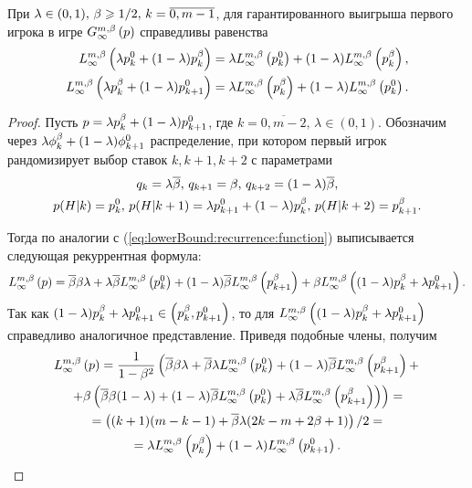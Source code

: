 \begin{proposition}
  \label{proposition:first:combination:game}
  При $\lambda \in (0, 1), \, \Co \geq 1/2, \, k = \overline{0, m-1}$,
  для гарантированного выигрыша первого игрока в игре $\infiniteGame{p}$
  справедливы равенства
  \begin{align*}
    \lowerBound{\lambda \pEven + (1-\lambda) \pOdd}      & = 
                                                           \lambda \lowerBound{\pEven} + (1-\lambda) \lowerBound{\pOdd}, \\
    \lowerBound{\lambda \pOdd + (1-\lambda) \pEven[k+1]} & =
                                                           \lambda \lowerBound{\pOdd} + (1-\lambda) \lowerBound{\pEven}.
  \end{align*}
\end{proposition}
\begin{proof}
  Пусть $p = \lambda \pOdd + (1-\lambda) \pEven[k+1]$, где $k =
  \overline{0, m - 2}, \, \lambda \in (0, 1)$. Обозначим через
  $\lambda\fOdd[k] + (1-\lambda)\fEven[k+1]$ распределение, при котором
  первый игрок рандомизирует выбор ставок $k, k+1, k+2$ с параметрами
  \begin{gather*}
    q_k = \lambda\DCo, \, q_{k+1} = \Co, \, q_{k+2} = (1-\lambda)\DCo,\\
    p(H|k) = \pEven, \, p(H|k+1) = \lambda \pEven[k+1] + (1-\lambda)
    \pOdd, \, p(H|k+2) = \pOdd[k+1].
  \end{gather*}
  
  Тогда по аналогии с (\ref{eq:lowerBound:recurrence:function})
  выписывается следующая рекуррентная формула:
  \[
    \lowerBound{p} = \DCo \Co \lambda + \lambda \DCo
    \lowerBound{\pEven} + (1-\lambda) \DCo \lowerBound{\pOdd[k+1]} +
    \Co \lowerBound{(1-\lambda) \pOdd + \lambda \pEven[k+1]}.
  \]
  Так как $(1-\lambda)\pOdd + \lambda \pEven[k+1] \in \left( \pOdd,
    \pEven[k+1] \right)$, то для $\lowerBound{(1-\lambda)\pOdd + \lambda
    \pEven[k+1]}$ справедливо аналогичное представление. Приведя
  подобные члены, получим
  \begin{multline}
    \label{eq:first:combination:game:2}
    \lowerBound{p} = \frac{1}{1-\Co^2}
    \left(\DCo\Co\lambda + \DCo\lambda\lowerBound{\pEven} + (1-\lambda)\DCo\lowerBound{\pOdd[k+1]} + \right.\\
    \left. + \Co \left( \DCo\Co(1-\lambda) +
        (1-\lambda)\DCo\lowerBound{\pEven} +
        \lambda\DCo\lowerBound{\pOdd[k+1]} \right)
    \right) = \\
    = \left( (k + 1)(m - k - 1) + \DCo\lambda(2k - m + 2\Co + 1)
    \right)/2 = \\
    = \lambda\lowerBound{\pOdd} + (1-\lambda)\lowerBound{\pEven[k+1]}.
  \end{multline}
  

\end{proof}
